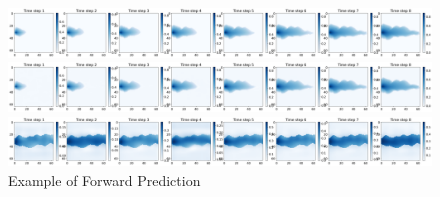 \documentclass[
]{article}
\begin{document}
\begin{figure}

\begin{minipage}{\linewidth}

\includegraphics[width=1\textwidth,height=\textheight]{../../plot/GCS_channel_plot/FNO_GCS_lowest_MSE_True.png}

\end{minipage}%
\newline
\begin{minipage}{\linewidth}

\includegraphics[width=1\textwidth,height=\textheight]{../../plot/GCS_channel_plot/FNO_GCS_lowest_MSE_Pred.png}

\end{minipage}%
\newline
\begin{minipage}{\linewidth}

\includegraphics[width=1\textwidth,height=\textheight]{../../plot/GCS_channel_plot/FNO_GCS_lowest_JAC_Pred.png}

\end{minipage}%

\caption{\label{fig-eig1000}Example of Forward Prediction}

\end{figure}%
\end{document}

